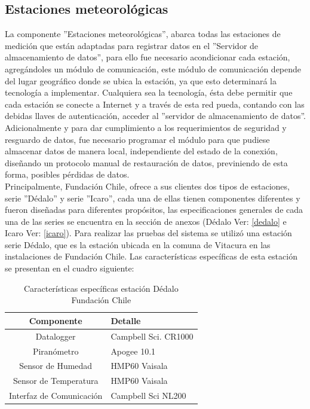 \newpage
\subsection{Estaciones meteorológicas}
La componente ''Estaciones meteorológicas'', abarca todas las estaciones de medición que están adaptadas para registrar datos en el ''Servidor de almacenamiento de datos'', para ello fue necesario acondicionar cada estación, agregándoles un módulo de comunicación, este módulo de comunicación depende del lugar geográfico donde se ubica la estación, ya que esto determinará la tecnología a implementar. Cualquiera sea la tecnología, ésta debe permitir que cada estación se conecte a Internet y a través de esta red pueda, contando con las debidas llaves de autenticación, acceder al ''servidor de almacenamiento de datos''. Adicionalmente y para dar cumplimiento a los requerimientos de seguridad y resguardo de datos, fue necesario programar el módulo para que pudiese almacenar datos de manera local, independiente del estado de la conexión, diseñando un protocolo manual de restauración de datos, previniendo de esta forma, posibles pérdidas de datos.\\

Principalmente, Fundación Chile, ofrece a sus clientes dos tipos de estaciones, serie ''Dédalo'' y serie ''Icaro'', cada una de ellas tienen componentes diferentes y fueron diseñadas para diferentes propósitos, las especificaciones generales de cada una de las series se encuentra en la sección de anexos (Dédalo Ver: \ref{dedalo} e Icaro Ver: \ref{icaro}). Para realizar las pruebas del sistema se utilizó una estación serie Dédalo, que es la estación ubicada en la comuna de Vitacura en las instalaciones de Fundación Chile. Las características específicas de esta estación se presentan en el cuadro siguiente:

\begin{table}[h!]
\label{estacionDedalo}
\caption{Características específicas estación Dédalo Fundación Chile}
\begin{tabular}{| c | p{9cm} |}
        \hline
        \textbf{Componente}  &       \textbf{Detalle}        \\
        \hline
	Datalogger&Campbell Sci. CR1000\\
	\hline
	Piranómetro&Apogee 10.1\\
	\hline
	Sensor de Humedad&HMP60 Vaisala\\
	\hline
	Sensor de Temperatura&HMP60 Vaisala\\
	\hline
	Interfaz de Comunicación&Campbell Sci NL200\\
	\hline
\end{tabular}
\end{table}

